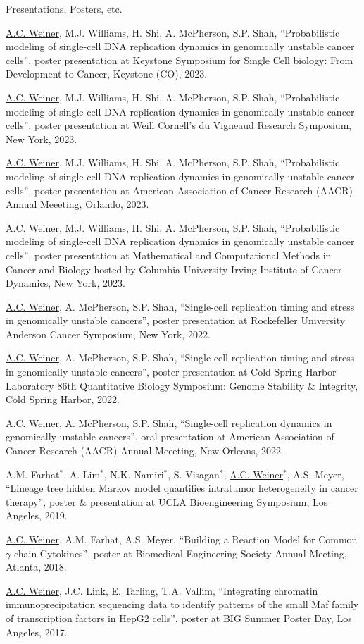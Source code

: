 \documentclass{resume} %
\begin{document}
\begin{rSection}{Presentations, Posters, etc.}

\underline{A.C. Weiner}, M.J. Williams, H. Shi, A. McPherson, S.P. Shah, ``Probabilistic modeling of single-cell DNA replication dynamics in genomically unstable cancer cells'', poster presentation at Keystone Symposium for Single Cell biology: From Development to Cancer, Keystone (CO), 2023.

\underline{A.C. Weiner}, M.J. Williams, H. Shi, A. McPherson, S.P. Shah, ``Probabilistic modeling of single-cell DNA replication dynamics in genomically unstable cancer cells'', poster presentation at Weill Cornell's du Vigneaud Research Symposium, New York, 2023.

\underline{A.C. Weiner}, M.J. Williams, H. Shi, A. McPherson, S.P. Shah, ``Probabilistic modeling of single-cell DNA replication dynamics in genomically unstable cancer cells'', poster presentation at American Association of Cancer Research (AACR) Annual Meeeting, Orlando, 2023.

\underline{A.C. Weiner}, M.J. Williams, H. Shi, A. McPherson, S.P. Shah, ``Probabilistic modeling of single-cell DNA replication dynamics in genomically unstable cancer cells'', poster presentation at Mathematical and Computational Methods in Cancer and Biology hosted by Columbia University Irving Institute of Cancer Dynamics, New York, 2023.

\underline{A.C. Weiner}, A. McPherson, S.P. Shah, ``Single-cell replication timing and stress in genomically unstable cancers'', poster presentation at Rockefeller University Anderson Cancer Symposium, New York, 2022.

\underline{A.C. Weiner}, A. McPherson, S.P. Shah, ``Single-cell replication timing and stress in genomically unstable cancers'', poster presentation at Cold Spring Harbor Laboratory 86th Quantitative Biology Symposium: Genome Stability \& Integrity, Cold Spring Harbor, 2022.

\underline{A.C. Weiner}, A. McPherson, S.P. Shah, ``Single-cell replication dynamics in genomically unstable cancers'', oral presentation at American Association of Cancer Research (AACR) Annual Meeeting, New Orleans, 2022.

A.M. Farhat$^{\ast}$, A. Lim$^{\ast}$, N.K. Namiri$^{\ast}$, S. Visagan$^{\ast}$, \underline{A.C. Weiner$^{\ast}$}, A.S. Meyer, ``Lineage tree hidden Markov model quantifies intratumor heterogeneity in cancer therapy'', poster \& presentation at UCLA Bioengineering Symposium, Los Angeles, 2019.

\underline{A.C. Weiner}, A.M. Farhat, A.S. Meyer, ``Building a Reaction Model for Common $\gamma$-chain Cytokines'', poster at Biomedical Engineering Society Annual Meeting, Atlanta, 2018.

\underline{A.C. Weiner}, J.C. Link, E. Tarling, T.A. Vallim, ``Integrating chromatin immunoprecipitation sequencing data to identify patterns of the small Maf family of transcription factors in HepG2 cells'', poster at BIG Summer Poster Day, Los Angeles, 2017.

\end{rSection}
\end{document}
